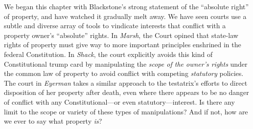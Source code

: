 We began this chapter with Blackstone's strong statement of the ``absolute
right'' of property, and have watched it gradually melt away. We have seen
courts use a subtle and diverse array of tools to vindicate interests that
conflict with a property owner's ``absolute'' rights. In \textit{Marsh}, the
Court opined that state-law rights of property must give way to more important
principles enshrined in the federal Constitution. In \textit{Shack}, the court
explicitly avoids this kind of Constitutional trump card by manipulating the
\textit{scope of the owner's rights} under the common law of property to avoid
conflict with competing \textit{statutory} policies. The court in
\textit{Eyerman} takes a similar approach to the testatrix's efforts to direct
disposition of her property after death, even where there appears to be no
danger of conflict with any Constitutional---or even statutory---interest. Is
there any limit to the scope or variety of these types of manipulations? And if
not, how are we ever to say what property \textit{is}?

